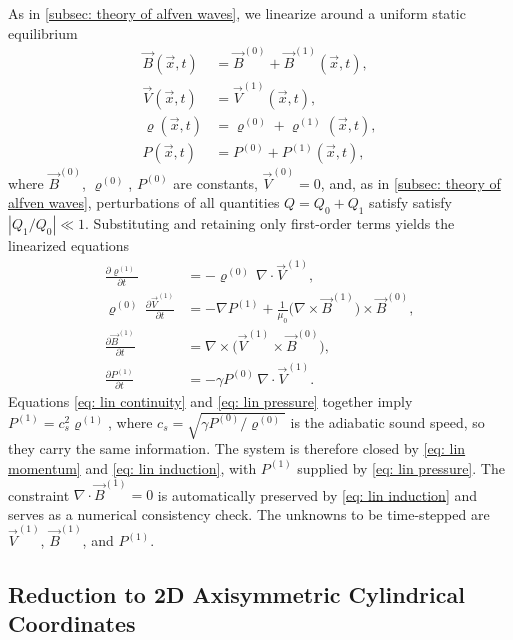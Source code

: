 As in \autoref{subsec: theory of alfven waves}, we linearize around a uniform static equilibrium
\begin{align*}
    \vec{B}(\vec{x}, t) &= \vec{B}^{(0)} + \vec{B}^{(1)}(\vec{x}, t), \\
    \vec{V}(\vec{x}, t) &= \vec{V}^{(1)}(\vec{x}, t), \\
    \varrho(\vec{x}, t) &= \varrho^{(0)} + \varrho^{(1)}(\vec{x}, t), \\
    P(\vec{x}, t)       &= P^{(0)} + P^{(1)}(\vec{x}, t),
\end{align*}
where $\vec{B}^{(0)}$, $\varrho^{(0)}$, $P^{(0)}$ are constants, $\vec{V}^{(0)} = 0$, and, as in \autoref{subsec: theory of alfven waves}, perturbations of all quantities $Q=Q_0 + Q_1$ satisfy
satisfy $|Q_1/Q_0| \ll 1$. Substituting and retaining only first-order terms yields
the linearized equations
\begin{align}
    \frac{\partial \varrho^{(1)}}{\partial t} &= -\varrho^{(0)}\, \nabla \cdot \vec{V}^{(1)},
        \label{eq: lin continuity} \\
    \varrho^{(0)}\, \frac{\partial \vec{V}^{(1)}}{\partial t} &= -\nabla P^{(1)}
        + \frac{1}{\mu_0}\bigl(\nabla \times \vec{B}^{(1)}\bigr) \times \vec{B}^{(0)},
        \label{eq: lin momentum} \\
    \frac{\partial \vec{B}^{(1)}}{\partial t} &= \nabla \times \bigl(\vec{V}^{(1)} \times \vec{B}^{(0)}\bigr),
        \label{eq: lin induction} \\
    \frac{\partial P^{(1)}}{\partial t} &= -\gamma P^{(0)}\, \nabla \cdot \vec{V}^{(1)}.
        \label{eq: lin pressure}
\end{align}
Equations \eqref{eq: lin continuity} and \eqref{eq: lin pressure} together imply
$P^{(1)} = c_s^2 \varrho^{(1)}$, where $c_s = \sqrt{\gamma P^{(0)} / \varrho^{(0)}}$ is the adiabatic
sound speed, so they carry the same information. The system is therefore closed by
\eqref{eq: lin momentum} and \eqref{eq: lin induction}, with $P^{(1)}$ supplied
by \eqref{eq: lin pressure}. The constraint $\nabla \cdot \vec{B}^{(1)} = 0$ is
automatically preserved by \eqref{eq: lin induction} and serves as a numerical
consistency check. The unknowns to be time-stepped are $\vec{V}^{(1)}$, $\vec{B}^{(1)}$,
and $P^{(1)}$.

\subsection{Reduction to 2D Axisymmetric Cylindrical Coordinates}
\label{subsec: 2D cylindrical reduction}

